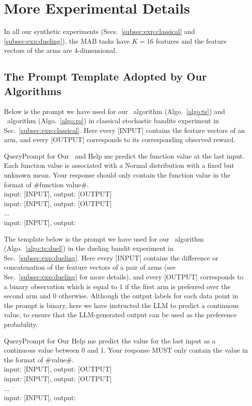 \section{More Experimental Details}
In all our synthetic experiments (Secs.~\ref{subsec:exp:classical} and \ref{subsec:exp:dueling}), the MAB tasks have $K=16$ features and the feature vectors of the arms are $4$-dimensional.

\subsection{The Prompt Template Adopted by Our Algorithms}
\label{app:subsec:prompt:template:our:algorithm}


Below is the prompt we have used for our \algts~algorithm (Algo.~\ref{algo:ts}) and \algro~algorithm (Algo.~\ref{algo:ro}) in classical stochastic bandits experiment in Sec.~\ref{subsec:exp:classical}. Here every {\color{blue}[INPUT]} contains the feature vectors of an arm, and every {\color{blue}[OUTPUT]} corresponds to its corresponding observed reward.
\begin{mycolorbox}{Query}{Prompt for Our \algts~and \algro}
\small
Help me predict the function value at the last input. Each function value is associated with a Normal distribution with a fixed but unknown mean. Your response should only contain the function value in the format of \#function value\#.\\
input: {\color{blue}[INPUT]}, output: {\color{blue}[OUTPUT]}\\
input: {\color{blue}[INPUT]}, output: {\color{blue}[OUTPUT]}\\
...\\
input: {\color{blue}[INPUT]}, output:
\\
\end{mycolorbox}

The template below is the prompt we have used for our \algtsduel~algorithm (Algo.~\ref{algo:ts:duel}) in the dueling bandit experiment in Sec.~\ref{subsec:exp:dueling}.
Here every {\color{red}[INPUT]} contains the difference or concatenation of the feature vectors of a pair of arms (see Sec.~\ref{subsec:exp:dueling} for more details), and every {\color{red}[OUTPUT]} corresponds to a binary observation which is equal to $1$ if the first arm is preferred over the second arm and $0$ otherwise.
Although the output labels for each data point in the prompt is binary, here we have instructed the LLM to predict a continuous value, to ensure that the LLM-generated output can be used as the preference probability.
\begin{mycolorbox}{Query}{Prompt for Our \algtsduel}
\small
Help me predict the value for the last input as a continuous value between 0 and 1. Your response MUST only contain the value in the format of \#value\#.\\
input: {\color{red}[INPUT]}, output: {\color{red}[OUTPUT]}\\
input: {\color{red}[INPUT]}, output: {\color{red}[OUTPUT]}\\
...\\
input: {\color{red}[INPUT]}, output:
\\
\end{mycolorbox}


